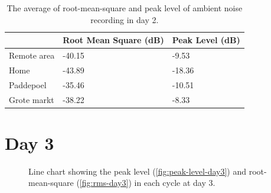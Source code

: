 \begin{table}[H]
\centering
\caption{The average of root-mean-square and peak level of ambient noise recording in day 2.}
\label{tab:ambient-noise-average-day2}
\begin{tabular}{lll} \toprule
            & Root Mean Square (dB) & Peak Level (dB) \\ \midrule
Remote area & -40.15                & -9.53          \\
Home        & -43.89                & -18.36           \\
Paddepoel   & -35.46                & -10.51          \\
Grote markt & -38.22              & -8.33        \\ \bottomrule
\end{tabular}
\end{table}





\section{Day 3} %
\label{sec:ambient-noise-day_3}
\begin{figure}[H]
	\centering
	\caption{Line chart showing the peak level (\ref{fig:peak-level-day3}) and root-mean-square (\ref{fig:rms-day3}) in each cycle at day 3.}
	\label{fig:audio-result-day3}
\end{figure}


